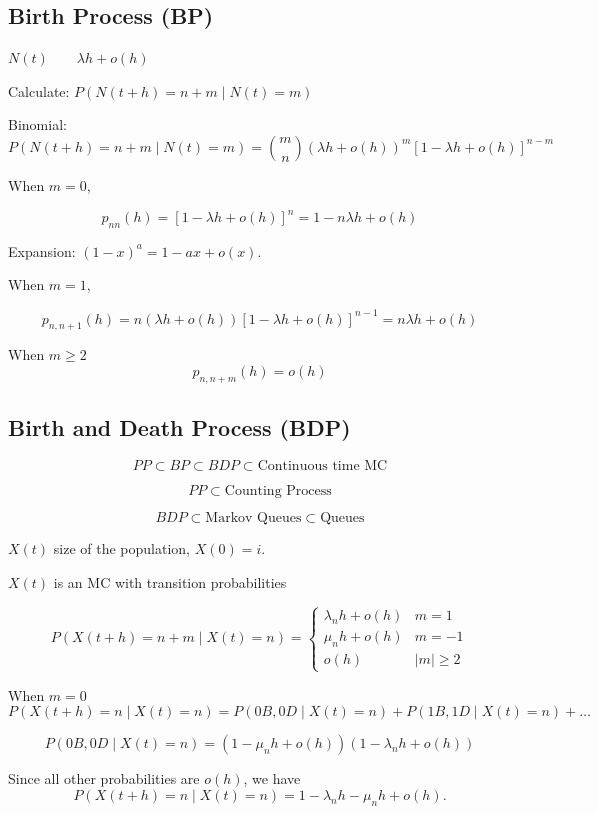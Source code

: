 \documentclass{article}
\theoremstyle{definition}
\begin{document}
\subsection{Birth Process (BP)}

$N(t) \qquad \lambda h + o(h)$

Calculate:
$P \left( N(t+h) = n + m \mid N(t) = m \right)$

Binomial:
$$
P \left( N(t+h) = n + m \mid N(t) = m \right) = {m \choose n} \left( \lambda h + o(h) \right)^m \left[ 1 - \lambda h + o(h) \right]^{n-m}
$$

When $m = 0$, 

$$
p_{nn}(h) = \left[ 1 - \lambda h + o(h) \right]^{n} = 1 - n \lambda h + o(h)
$$

Expansion: $(1-x)^a = 1 - ax + o(x)$.

When $m = 1$, 

$$
p_{n,n+1}(h) = n ( \lambda h + o(h) ) \left[ 1 - \lambda h + o(h) \right]^{n-1} =  n \lambda h + o(h) 
$$

When $m \ge 2$
$$
p_{n,n+m}(h) = o(h)
$$

\subsection{Birth and Death Process (BDP)}

$$
PP \subset BP \subset BDP \subset \text{Continuous time MC}
$$

$$
PP \subset \text{Counting Process}
$$

$$
BDP \subset \text{Markov Queues} \subset \text{Queues}
$$

$X(t)$ size of the population, $X(0) = i$.

$X(t)$ is an MC with transition probabilities

$$
P \left( X(t+h) = n + m \mid X(t) = n \right) = \begin{cases}
\lambda_n h + o(h) & m = 1 \\
\mu_n h + o(h) & m = -1 \\
o(h) & |m| \ge 2 
\end{cases}
$$

When $m=0$
$$
P \left( X(t+h) = n \mid X(t) = n \right) = P(0B,0D \mid X(t) = n ) + P(1B, 1D \mid X(t) = n) + \ldots
$$

$$
P(0B,0D \mid X(t) = n ) = (1 - \mu_n h + o(h) ) ( 1 - \lambda_n h + o(h) ) 
$$

Since all other probabilities are $o(h)$, we have
$$
P \left( X(t+h) = n \mid X(t) = n \right) = 1 - \lambda_n h - \mu_n h + o(h).
$$
\end{document}
